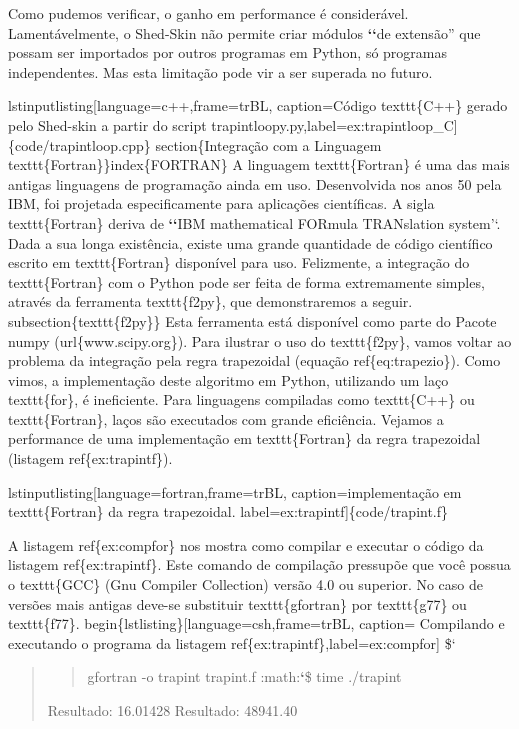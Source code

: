 \documentclass[a4paper,10pt,brazil]{sphinxmanual}
\begin{document}
Como pudemos verificar, o ganho em performance é considerável. Lamentávelmente, o Shed-Skin não permite criar módulos {\color{red}\bfseries{}{}`{}`}de extensão'' que possam ser importados por outros programas em Python, só programas independentes. Mas esta limitação pode vir a ser superada no futuro.

lstinputlisting{[}language=c++,frame=trBL, caption=Código texttt\{C++\} gerado pelo Shed-skin a partir do script trapintloopy.py,label=ex:trapintloop\_C{]}\{code/trapintloop.cpp\}
section\{Integração com a Linguagem texttt\{Fortran\}\}index\{FORTRAN\}
A linguagem texttt\{Fortran\} é uma das mais antigas linguagens de programação ainda em uso. Desenvolvida nos anos 50 pela IBM, foi projetada especificamente para aplicações científicas. A sigla texttt\{Fortran\} deriva de {\color{red}\bfseries{}{}`{}`}IBM mathematical FORmula TRANslation system'`. Dada a sua longa existência, existe uma grande quantidade de código científico escrito em texttt\{Fortran\} disponível para uso. Felizmente, a integração do texttt\{Fortran\} com o Python pode ser feita de forma extremamente simples, através da ferramenta texttt\{f2py\}, que demonstraremos a seguir.
subsection\{texttt\{f2py\}\}
Esta ferramenta está disponível como parte do Pacote numpy (url\{www.scipy.org\}). Para ilustrar o uso do texttt\{f2py\}, vamos voltar ao problema da integração pela regra trapezoidal (equação ref\{eq:trapezio\}). Como vimos, a implementação deste algoritmo em Python, utilizando um laço texttt\{for\}, é ineficiente. Para linguagens compiladas como texttt\{C++\} ou texttt\{Fortran\}, laços são executados com grande eficiência. Vejamos a performance de uma implementação em texttt\{Fortran\} da regra trapezoidal (listagem ref\{ex:trapintf\}).

lstinputlisting{[}language=fortran,frame=trBL, caption=implementação em texttt\{Fortran\} da regra trapezoidal. label=ex:trapintf{]}\{code/trapint.f\}

A listagem ref\{ex:compfor\} nos mostra como compilar e executar o código da listagem ref\{ex:trapintf\}. Este comando de compilação pressupõe que você possua  o texttt\{GCC\} (Gnu Compiler Collection) versão 4.0 ou superior. No caso de versões mais antigas deve-se substituir texttt\{gfortran\} por texttt\{g77\} ou texttt\{f77\}.
begin\{lstlisting\}{[}language=csh,frame=trBL, caption= Compilando e executando o programa da listagem ref\{ex:trapintf\},label=ex:compfor{]}
\${}`
\begin{quote}
\begin{quote}

gfortran -o trapint trapint.f
:math:{\color{red}\bfseries{}{}`}\$ time ./trapint
\end{quote}

Resultado:    16.01428
Resultado:    48941.40
\end{quote}
\end{document}
